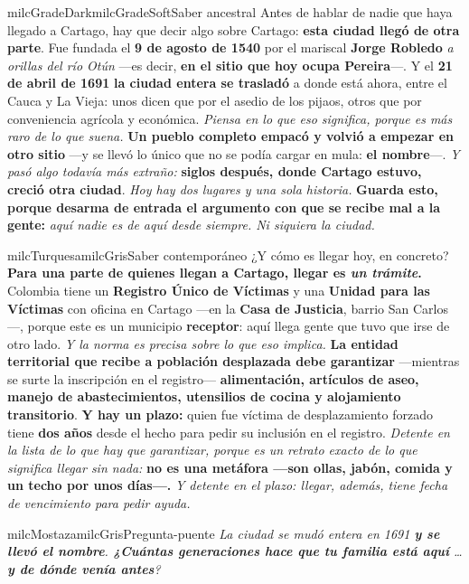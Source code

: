 \documentclass[11pt,letterpaper]{article}
\begin{document}
\begin{softbox}{milcGradeDark}{milcGradeSoft}{Saber ancestral}
Antes de hablar de nadie que haya llegado a Cartago, hay que decir algo sobre Cartago: \textbf{esta ciudad llegó de otra parte}. Fue fundada el \textbf{9 de agosto de 1540} por el mariscal \textbf{Jorge Robledo} \emph{a orillas del río Otún} ---es decir, \textbf{en el sitio que hoy ocupa Pereira}---. Y el \textbf{21 de abril de 1691} \textbf{la ciudad entera se trasladó} a donde está ahora, entre el Cauca y La Vieja: unos dicen que por el asedio de los pijaos, otros que por conveniencia agrícola y económica. \emph{Piensa en lo que eso significa, porque es más raro de lo que suena.} \textbf{Un pueblo completo empacó y volvió a empezar en otro sitio} ---y se llevó lo único que no se podía cargar en mula: \textbf{el nombre}---. \emph{Y pasó algo todavía más extraño:} \textbf{siglos después, donde Cartago estuvo, creció otra ciudad}. \emph{Hoy hay dos lugares y una sola historia.} \textbf{Guarda esto, porque desarma de entrada el argumento con que se recibe mal a la gente:} \emph{aquí nadie es de aquí desde siempre. Ni siquiera la ciudad.}
\end{softbox}

\begin{softbox}{milcTurquesa}{milcGris}{Saber contemporáneo}
¿Y cómo es llegar hoy, en concreto? \textbf{Para una parte de quienes llegan a Cartago, llegar es \emph{un trámite}.} Colombia tiene un \textbf{Registro Único de Víctimas} y una \textbf{Unidad para las Víctimas} con oficina en Cartago ---en la \textbf{Casa de Justicia}, barrio San Carlos---, porque este es un municipio \textbf{receptor}: aquí llega gente que tuvo que irse de otro lado. \emph{Y la norma es precisa sobre lo que eso implica.} \textbf{La entidad territorial que recibe a población desplazada debe garantizar} ---mientras se surte la inscripción en el registro--- \textbf{alimentación, artículos de aseo, manejo de abastecimientos, utensilios de cocina y alojamiento transitorio}. \textbf{Y hay un plazo:} quien fue víctima de desplazamiento forzado tiene \textbf{dos años} desde el hecho para pedir su inclusión en el registro. \emph{Detente en la lista de lo que hay que garantizar, porque es un retrato exacto de lo que significa llegar sin nada:} \textbf{no es una metáfora ---son ollas, jabón, comida y un techo por unos días---.} \emph{Y detente en el plazo: llegar, además, tiene fecha de vencimiento para pedir ayuda.}
\end{softbox}

\begin{softbox}{milcMostaza}{milcGris}{Pregunta-puente}
\textit{La ciudad se mudó entera en 1691 \textbf{y se llevó el nombre}. \textbf{¿Cuántas generaciones hace que tu familia está aquí} \ldots \textbf{y de dónde venía antes}?}
\end{softbox}
\end{document}
